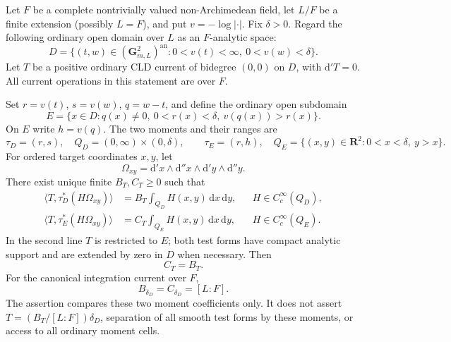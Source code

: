 \begin{proposition}
\label{prop:p213-mixed-branch-transport}
Let \(F\) be a complete nontrivially valued non-Archimedean
field, let \(L/F\) be a finite extension (possibly \(L=F\)),
and put \(v=-\log|\cdot|\). Fix \(\delta>0\).
Regard the following ordinary open domain over \(L\) as an
\(F\)-analytic space:
\[
 D=\{(t,w)\in(\mathbf G_{m,L}^2)^{\mathrm{an}}:
             0<v(t)<\infty,\ 0<v(w)<\delta\}.
\]
Let \(T\) be a positive ordinary CLD current of bidegree
\((0,0)\) on \(D\), with \(\mathrm d'T=0\).
All current operations in this statement are over \(F\).

Set \(r=v(t)\), \(s=v(w)\), \(q=w-t\), and define the
ordinary open subdomain
\[
 E=\{x\in D:q(x)\ne0,\ 0<r(x)<\delta,\ v(q(x))>r(x)\}.
\]
On \(E\) write \(h=v(q)\). The two moments and their ranges are
\[
 \tau_D=(r,s),\quad
 Q_D=(0,\infty)\times(0,\delta),\qquad
 \tau_E=(r,h),\quad
 Q_E=\{(x,y)\in\mathbf R^2:0<x<\delta,\ y>x\}.
\]
For ordered target coordinates \(x,y\), let
\[
 \Omega_{xy}=\mathrm d'x\wedge\mathrm d''x\wedge
             \mathrm d'y\wedge\mathrm d''y .
\]
There exist unique finite \(B_T,C_T\geq0\) such that
\begin{align}
 \langle T,\tau_D^*(H\Omega_{xy})\rangle
   &=B_T\int_{Q_D}H(x,y)\,\mathrm dx\,\mathrm dy,
       &&H\in C_c^\infty(Q_D),\label{eq:p213-mixed-old}\\
 \langle T,\tau_E^*(H\Omega_{xy})\rangle
   &=C_T\int_{Q_E}H(x,y)\,\mathrm dx\,\mathrm dy,
       &&H\in C_c^\infty(Q_E).\label{eq:p213-mixed-new}
\end{align}
In the second line \(T\) is restricted to \(E\); both test
forms have compact analytic support and are extended by
zero in \(D\) when necessary. Then
\begin{equation}
 \label{eq:p213-mixed-equality}
                         C_T=B_T .
\end{equation}
For the canonical integration current over \(F\),
\[
                    B_{\delta_D}=C_{\delta_D}=[L:F].
\]
The assertion compares these two moment coefficients only.
It does not assert \(T=(B_T/[L:F])\delta_D\), separation of
all smooth test forms by these moments, or access to all
ordinary moment cells.
\end{proposition}

